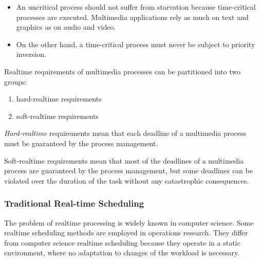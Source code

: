\begin{multicols}{2}
\begin{itemize}
	\item An uncritical process should not suffer from starvation because time-critical	processes are executed. Multimedia applications rely as much on text and graphics as on audio and video.
		
	\item On the other hand, a time-critical process must never be subject to priority inversion.
	\end{itemize}
\end{multicols}



Realtime requirements of multimedia processes can be partitioned into two groups: 
\begin{multicols}{2}
	\begin{enumerate}
		\item hard-realtime requirements
		\item soft-realtime requirements
	\end{enumerate}
\end{multicols}

\textit{Hard-realtime} requirements mean that each deadline of a multimedia process must be guaranteed by the process management.

Soft-realtime requirements mean that most of the deadlines of a multimedia process are guaranteed by the process management, but some deadlines can be violated over the duration of the task without any catastrophic consequences.

\subsubsection*{Traditional Real-time Scheduling}
The problem of realtime processing is widely known in computer science. Some realtime scheduling methods are employed in operations research. They differ from computer science realtime scheduling because they operate in a static environment, where no adaptation to changes of the workload is necessary.

